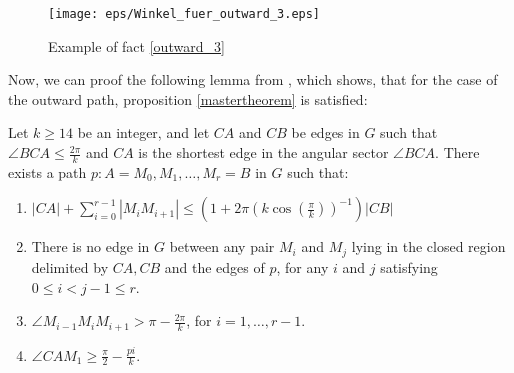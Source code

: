 \begin{figure}[h!]
\centering
\texttt{[image: eps/Winkel\_fuer\_outward\_3.eps]}
\caption{Example of fact \ref{outward_3} }
\label{fig:winkel_fuer_outward_3}
\end{figure}


Now, we can proof the following lemma from \cite{kanj}, which shows, that for the case of the outward path, proposition \ref{mastertheorem} is satisfied:

\begin{lemma}
Let $k \geq 14$ be an integer, and let $CA $ and $CB $ be edges in $G $ such that $\angle{BCA} \leq \frac{2\pi}{k} $ and $CA $ is the shortest edge in the angular sector $\angle{BCA} $. There exists a path $p : A=M_0, M_1, \dotsc, M_r=B $ in $G $ such that:
\begin{enumerate}
\renewcommand{\labelenumi}{(\roman{enumi})}
\item $|CA| + \sum_{i=0}^{r-1}|M_iM_{i+1}| \leq (1+2\pi(k \cos(\frac{\pi}{k}))^{-1})|CB|$
\item There is no edge in $G $ between any pair $M_i $ and $M_j $ lying in the closed region delimited by $CA, CB $ and the edges of $p $, for any $i $ and $j $ satisfying $0 \leq i < j -1 \leq r $.
\item $\angle{M_{i-1}M_iM_{i+1}} > \pi - \frac{2\pi}{k} $, for $i=1,\dotsc,r-1 $.
\item $\angle{CAM_1} \geq \frac{\pi}{2} - \frac{pi}{k} $.
\end{enumerate}	 
\end{lemma}

